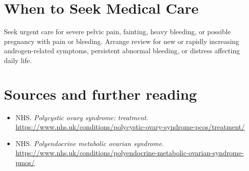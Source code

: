 \section*{When to Seek Medical Care}
Seek urgent care for severe pelvic pain, fainting, heavy bleeding, or possible pregnancy with pain or bleeding. Arrange review for new or rapidly increasing androgen-related symptoms, persistent abnormal bleeding, or distress affecting daily life.

\section*{Sources and further reading}
\begin{itemize}
\item NHS. \textit{Polycystic ovary syndrome: treatment}. \url{https://www.nhs.uk/conditions/polycystic-ovary-syndrome-pcos/treatment/}
\item NHS. \textit{Polyendocrine metabolic ovarian syndrome}. \url{https://www.nhs.uk/conditions/polyendocrine-metabolic-ovarian-syndrome-pmos/}
\end{itemize}
